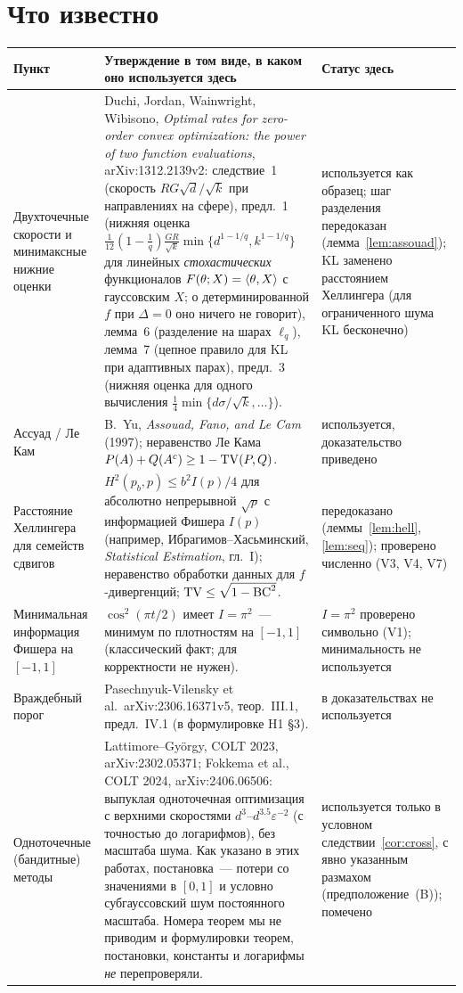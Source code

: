 \documentclass[11pt,a4paper]{article}
\numberwithin{equation}{section}
\theoremstyle{definition}
\theoremstyle{remark}
\begin{document}
\section{Что известно}\label{sec:known}
\begin{center}\small
\begin{tabularx}{\textwidth}{@{}p{2.6cm}Xp{2.5cm}@{}}
\toprule
Пункт & Утверждение в том виде, в каком оно используется здесь & Статус здесь\\
\midrule
Двухточечные скорости и минимаксные нижние оценки & Duchi, Jordan, Wainwright, Wibisono, \emph{Optimal rates for zero-order convex optimization: the power of two function evaluations}, arXiv:1312.2139v2: следствие~1 (скорость $RG\sqrt d/\sqrt k$ при направлениях на сфере), предл.~1 (нижняя оценка $\frac1{12}(1-\frac1q)\frac{GR}{\sqrt k}\min\{d^{1-1/q},k^{1-1/q}\}$ для линейных \emph{стохастических} функционалов $F(\theta;X)=\langle \theta,X\rangle$ с гауссовским $X$; о детерминированной $f$ при $\Delta=0$ оно ничего не говорит), лемма~6 (разделение на шарах $\ell_q$), лемма~7 (цепное правило для KL при адаптивных парах), предл.~3 (нижняя оценка для одного вычисления $\frac14\min\{d\sigma/\sqrt k,\dots\}$). & используется как образец; шаг разделения передоказан (лемма~\ref{lem:assouad}); KL заменено расстоянием Хеллингера (для ограниченного шума KL бесконечно) \\
Ассуад / Ле Кам & B.~Yu, \emph{Assouad, Fano, and Le Cam} (1997); неравенство Ле Кама $P(A)+Q(A^c)\ge1-\mathrm{TV}(P,Q)$. & используется, доказательство приведено \\
Расстояние Хеллингера для семейств сдвигов & $H^2(p_b,p)\le b^2I(p)/4$ для абсолютно непрерывной $\sqrt p$ с информацией Фишера $I(p)$ (например, Ибрагимов--Хасьминский, \emph{Statistical Estimation}, гл.~I); неравенство обработки данных для $f$-дивергенций; $\mathrm{TV}\le\sqrt{1-\mathrm{BC}^2}$. & передоказано (леммы~\ref{lem:hell}, \ref{lem:seq}); проверено численно (V3, V4, V7) \\
Минимальная информация Фишера на $[-1,1]$ & $\cos^2(\pi t/2)$ имеет $I=\pi^2$~--- минимум по плотностям на $[-1,1]$ (классический факт; для корректности не нужен). & $I=\pi^2$ проверено символьно (V1); минимальность не используется \\
Враждебный порог & Pasechnyuk-Vilensky et al.\ arXiv:2306.16371v5, теор.~III.1, предл.~IV.1 (в формулировке H1 \S3). & в доказательствах не используется \\
Одноточечные (бандитные) методы & Lattimore--Gy\"orgy, COLT 2023, arXiv:2302.05371; Fokkema et al., COLT 2024, arXiv:2406.06506: выпуклая одноточечная оптимизация с верхними скоростями $d^3$--$d^{3.5}\varepsilon^{-2}$ (с точностью до логарифмов), без масштаба шума. Как указано в этих работах, постановка~--- потери со значениями в $[0,1]$ и условно субгауссовский шум постоянного масштаба. Номера теорем мы не приводим и формулировки теорем, постановки, константы и логарифмы \emph{не} перепроверяли. & используется только в условном следствии~\ref{cor:cross}, с явно указанным размахом (предположение~(B)); помечено \\

\end{tabularx}
\end{center}
\end{document}
